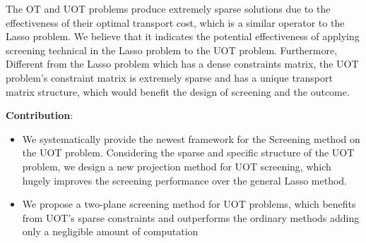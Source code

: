 The OT and UOT problems produce extremely sparse solutions due to the effectiveness of their optimal transport cost, which is a similar operator to the Lasso problem. We believe that it indicates the potential effectiveness of applying screening technical in the Lasso problem to the UOT problem. Furthermore, Different from the Lasso problem which has a dense constraints matrix, the UOT problem's constraint matrix is extremely sparse and has a unique transport matrix structure, which would benefit the design of screening and the outcome.


\textbf{Contribution}: 
\begin{itemize}
\item We systematically provide the newest framework for the Screening method on the UOT problem. Considering the sparse and specific structure of the UOT problem, we design a new projection method for UOT screening, which hugely improves the screening performance over the general Lasso method.
\item We propose a two-plane screening method for UOT problems, which benefits from UOT's sparse constraints and outperforms the ordinary methods adding only a negligible amount of computation
\end{itemize}



